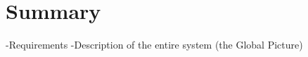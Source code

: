 \section*{Summary}\label{cha:summary}%
-Requirements
-Description of the entire system (the Global Picture)




